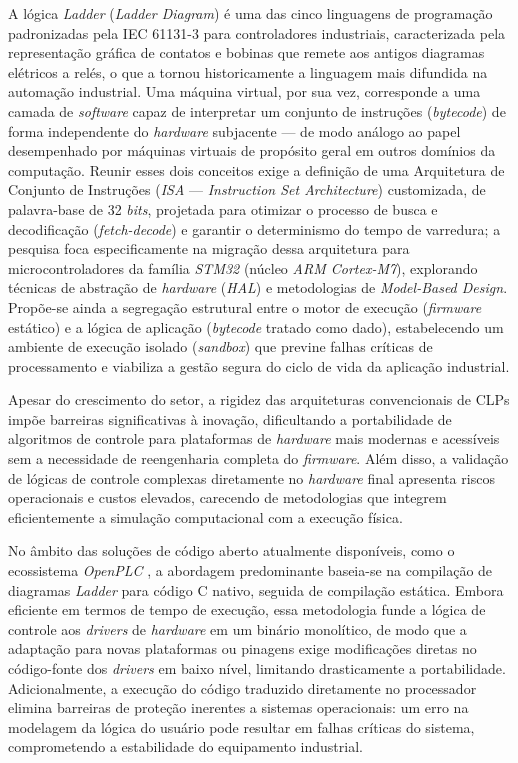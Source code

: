 A lógica \textit{Ladder} (\textit{Ladder Diagram}) é uma das cinco linguagens de programação padronizadas pela IEC 61131-3 para controladores industriais, caracterizada pela representação gráfica de contatos e bobinas que remete aos antigos diagramas elétricos a relés, o que a tornou historicamente a linguagem mais difundida na automação industrial.
Uma máquina virtual, por sua vez, corresponde a uma camada de \textit{software} capaz de interpretar um conjunto de instruções (\textit{bytecode}) de forma independente do \textit{hardware} subjacente --- de modo análogo ao papel desempenhado por máquinas virtuais de propósito geral em outros domínios da computação.
Reunir esses dois conceitos exige a definição de uma Arquitetura de Conjunto de Instruções (\textit{ISA} --- \textit{Instruction Set Architecture}) customizada, de palavra-base de 32 \textit{bits}, projetada para otimizar o processo de busca e decodificação (\textit{fetch-decode}) e garantir o determinismo do tempo de varredura; a pesquisa foca especificamente na migração dessa arquitetura para microcontroladores da família \textit{STM32} (núcleo \textit{ARM Cortex-M7}), explorando técnicas de abstração de \textit{hardware} (\textit{HAL}) e metodologias de \textit{Model-Based Design}.
Propõe-se ainda a segregação estrutural entre o motor de execução (\textit{firmware} estático) e a lógica de aplicação (\textit{bytecode} tratado como dado), estabelecendo um ambiente de execução isolado (\textit{sandbox}) que previne falhas críticas de processamento e viabiliza a gestão segura do ciclo de vida da aplicação industrial.

Apesar do crescimento do setor, a rigidez das arquiteturas convencionais de CLPs impõe barreiras significativas à inovação, dificultando a portabilidade de algoritmos de controle para plataformas de \textit{hardware} mais modernas e acessíveis sem a necessidade de reengenharia completa do \textit{firmware}.
Além disso, a validação de lógicas de controle complexas diretamente no \textit{hardware} final apresenta riscos operacionais e custos elevados, carecendo de metodologias que integrem eficientemente a simulação computacional com a execução física.

No âmbito das soluções de código aberto atualmente disponíveis, como o ecossistema \textit{OpenPLC} \cite{alves:2018}, a abordagem predominante baseia-se na compilação de diagramas \textit{Ladder} para código C nativo, seguida de compilação estática.
Embora eficiente em termos de tempo de execução, essa metodologia funde a lógica de controle aos \textit{drivers} de \textit{hardware} em um binário monolítico, de modo que a adaptação para novas plataformas ou pinagens exige modificações diretas no código-fonte dos \textit{drivers} em baixo nível, limitando drasticamente a portabilidade.
Adicionalmente, a execução do código traduzido diretamente no processador elimina barreiras de proteção inerentes a sistemas operacionais: um erro na modelagem da lógica do usuário pode resultar em falhas críticas do sistema, comprometendo a estabilidade do equipamento industrial.

